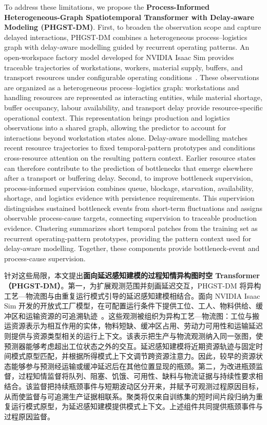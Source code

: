 \documentclass[a4paper,fleqn]{cas-dc}
\newcommand{\zhpara}[1]{%
  \par\begingroup\small\color{black!72}\noindent #1\par\endgroup}
\begin{document}
To address these limitations, we propose the \textbf{Process-Informed Heterogeneous-Graph Spatiotemporal Transformer with Delay-aware Modeling (PHGST-DM)}. First, to broaden the observation scope and capture delayed interactions, PHGST-DM combines a heterogeneous process--logistics graph with delay-aware modelling guided by recurrent operating patterns. An open-workspace factory model developed for NVIDIA Isaac Sim provides traceable trajectories of workstations, workers, material supply, buffers, and transport resources under configurable operating conditions~\cite{lu2020digital,isaacsim2026,xue2026safe}. These observations are organized as a heterogeneous process--logistics graph: workstations and handling resources are represented as interacting entities, while material shortage, buffer occupancy, labour availability, and transport delay provide resource-specific operational context. This representation brings production and logistics observations into a shared graph, allowing the predictor to account for interactions beyond workstation states alone. Delay-aware modelling matches recent resource trajectories to fixed temporal-pattern prototypes and conditions cross-resource attention on the resulting pattern context. Earlier resource states can therefore contribute to the prediction of bottlenecks that emerge elsewhere after a transport or buffering delay. Second, to improve bottleneck supervision, process-informed supervision combines queue, blockage, starvation, availability, shortage, and logistics evidence with persistence requirements. This supervision distinguishes sustained bottleneck events from short-term fluctuations and assigns observable process-cause targets, connecting supervision to traceable production evidence. Clustering summarizes short temporal patches from the training set as recurrent operating-pattern prototypes, providing the pattern context used for delay-aware modelling. Together, these components provide bottleneck-event and process-cause supervision.

\zhpara{针对这些局限，本文提出\textbf{面向延迟感知建模的过程知情异构图时空 Transformer（PHGST-DM）}。第一，为扩展观测范围并刻画延迟交互，PHGST-DM 将异构工艺—物流图与由重复运行模式引导的延迟感知建模相结合。面向 NVIDIA Isaac Sim 开发的开放式工厂模型，在可配置运行条件下提供工位、工人、物料供给、缓冲区和运输资源的可追溯轨迹~\cite{lu2020digital,isaacsim2026,xue2026safe}。这些观测被组织为异构工艺—物流图：工位与搬运资源表示为相互作用的实体，物料短缺、缓冲区占用、劳动力可用性和运输延迟则提供与资源类型相关的运行上下文。该表示把生产与物流观测纳入同一张图，使预测器能够考虑超出工位状态之外的交互。延迟感知建模将近期资源轨迹与固定时间模式原型匹配，并根据所得模式上下文调节跨资源注意力。因此，较早的资源状态能够参与预测经运输或缓冲延迟后在其他位置显现的瓶颈。第二，为改进瓶颈监督，过程知情监督将队列、阻塞、饥饿、可用性、缺料与物流证据与持续性要求相结合。该监督把持续瓶颈事件与短期波动区分开来，并赋予可观测过程原因目标，从而使监督与可追溯生产证据相联系。聚类将仅来自训练集的短时间片段归纳为重复运行模式原型，为延迟感知建模提供模式上下文。上述组件共同提供瓶颈事件与过程原因监督。}
\end{document}
